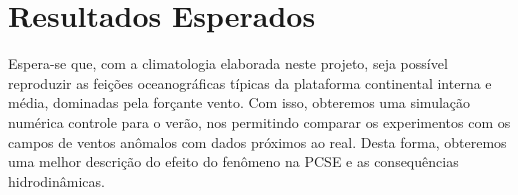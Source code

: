 \chapter{Resultados Esperados}

\hspace{5mm} Espera-se que, com a climatologia elaborada neste projeto, seja possível reproduzir as feições oceanográficas típicas da plataforma continental interna e média, dominadas pela forçante vento. Com isso, obteremos uma simulação numérica controle para o verão, nos permitindo comparar os experimentos com os campos de ventos anômalos com dados próximos ao real. Desta forma, obteremos uma melhor descrição do efeito do fenômeno na PCSE e as consequências hidrodinâmicas.
% 
